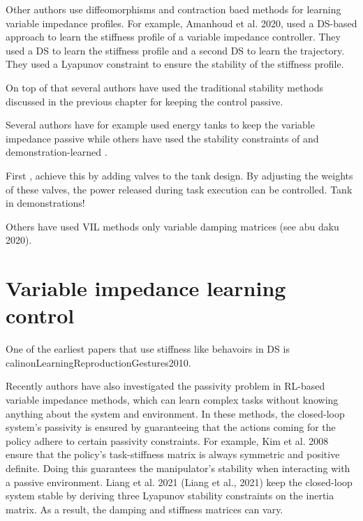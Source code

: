 Other authors use diffeomorphisms and contraction baed methods for learning variable impedance profiles. For example, Amanhoud et al. 2020, \cite{amanhoudDynamicalSystemApproach2019} used a DS-based approach to learn the stiffness profile of a variable impedance controller. They used a DS to learn the stiffness profile and a second DS to learn the trajectory. They used a Lyapunov constraint to ensure the stability of the stiffness profile.

On top of that several authors have used the traditional stability methods discussed in the previous chapter for keeping the control passive.

Several authors have for example used energy tanks to keep the variable impedance passive \cite{amanhoudForceAdaptationContact2020,enayatiVariableImpedanceForceControl2020,kastritsiProgressiveAutomationDMP2018,michelBilateralTeleoperationAdaptive2021,saverianoEnergybasedApproachEnsure2020,shahriariAdaptingContactsEnergy2017,wuFrameworkAutonomousImpedance2021,amanhoudDynamicalSystemApproach2019,kronanderPassiveInteractionControl2016} while others have used the stability constraints of and demonstration-learned \cite{arduengoGaussianProcessbasedRobotLearning2020,douRobotSkillLearning2022}.

First \cite{shahriariAdaptingContactsEnergy2017}, achieve this by adding valves to the tank design. By adjusting the weights of these valves, the power released during task execution can be controlled. Tank in demonstrations!

Others have used VIL methods only variable damping matrices (see abu daku 2020).


\section{Variable impedance learning control}


One of the earliest papers that use stiffness like behavoirs in DS is calinonLearningReproductionGestures2010.

Recently authors have also investigated the passivity problem in RL-based variable impedance methods, which can learn complex tasks without knowing anything about the system and environment. In these methods, the closed-loop system's passivity is ensured by guaranteeing that the actions coming for the policy adhere to certain passivity constraints. For example, Kim et al. 2008 \cite{kimLearningRobotStiffness2008} ensure that the policy's task-stiffness matrix is always symmetric and positive definite. Doing this guarantees the manipulator's stability when interacting with a passive environment. Liang et al. 2021 (Liang et al., 2021) keep the closed-loop system stable by deriving three Lyapunov stability constraints on the inertia matrix. As a result, the damping and stiffness matrices can vary.

